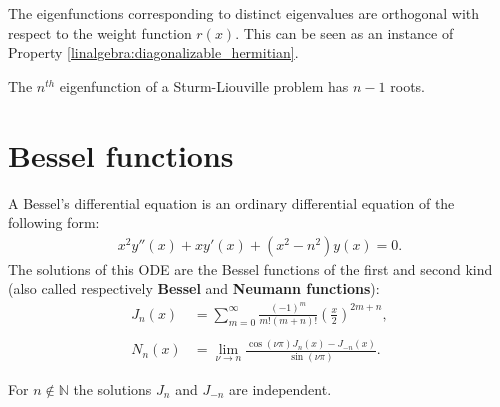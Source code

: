     \begin{property}
        The eigenfunctions corresponding to distinct eigenvalues are orthogonal with respect to the weight function $r(x)$. This can be seen as an instance of Property \ref{linalgebra:diagonalizable_hermitian}.
    \end{property}

    \begin{theorem}
        The $n^{th}$ eigenfunction of a Sturm-Liouville problem has $n-1$ roots.
    \end{theorem}

\section{Bessel functions}

    A Bessel's differential equation is an ordinary differential equation of the following form:
    \begin{gather}
        \label{ode:differential_equation}
        x^2y''(x) + xy'(x) + (x^2 - n^2)y(x) = 0.
    \end{gather}
    The solutions of this ODE are the Bessel functions of the first and second kind (also called respectively \textbf{Bessel} and \textbf{Neumann functions}):
    \begin{align}
        \label{ode:bessel_function}
        J_n(x) &= \sum_{m=0}^\infty\frac{(-1)^m}{m!(m+n)!}\left(\frac{x}{2}\right)^{2m+n},\\\nonumber\\
        \label{ode:neumann_function}
        N_n(x) &= \lim_{\nu\rightarrow n}\frac{\cos(\nu\pi)J_n(x) - J_{-n}(x)}{\sin(\nu\pi)}.
    \end{align}


    \begin{property}
        For $n\not\in\mathbb{N}$ the solutions $J_n$ and $J_{-n}$ are independent.
    \end{property}

